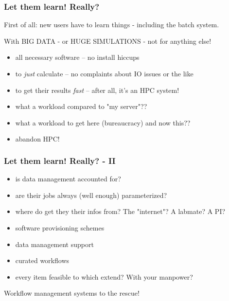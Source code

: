 \begin{frame}
  \frametitle{Let them learn! Really?}
  \bcinfo First of all: new users have to learn things - including the batch system.
  \pause
  \begin{question}
  	\pause With BIG DATA - or HUGE SIMULATIONS - not for anything else!
  \end{question}
  \pause
  \begin{question}
  	\begin{itemize}[<+->]
  		\item all necessary software -- no install hiccups
  		\item to \emph{just} calculate -- no complaints about IO issues or the like
  		\item to get their results \emph{fast} -- after all, it's an HPC system!
  	\end{itemize}
  \end{question}
  \pause
  \begin{question}
  	\begin{itemize}[<+->]
  		\item what a workload compared to "my server"??
  		\item what a workload to get here (bureaucracy) and now this??
  		\item abandon HPC!
  	\end{itemize}
  \end{question}	
\end{frame}	

\begin{frame}
  \frametitle{Let them learn! Really? - II}
  \begin{question}
	\begin{itemize}[<+->]
		\item is data management accounted for?
		\item are their jobs always (well enough) parameterized?
		\item where do get they their infos from? The "internet"? A labmate? A PI?
	\end{itemize}	
  \end{question}
  \pause
  \begin{question}
    \begin{itemize}[<+->]
      \item software provisioning schemes
      \item data management support
      \item curated workflows
      \item every item feasible to which extend? With your manpower?
    \end{itemize}
  \end{question}
  \pause
  \begin{hint}
  	Workflow management systems to the rescue!
  \end{hint}
\end{frame}	


